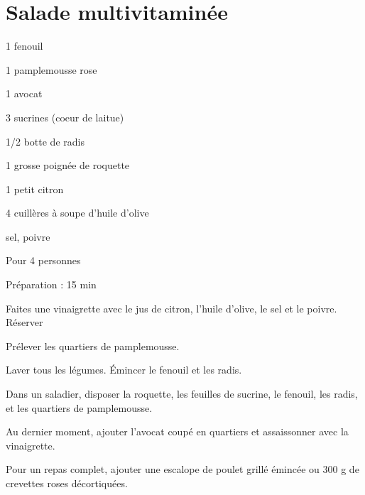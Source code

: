 \section{Salade multivitaminée}

\begin{ingredients}
\item 1 fenouil
\item 1 pamplemousse rose
\item 1 avocat
\item 3 sucrines (coeur de laitue)
\item 1/2 botte de radis
\item 1 grosse poignée de roquette
\item 1 petit citron
\item 4 cuillères à soupe d'huile d'olive
\item sel, poivre
\end{ingredients}
\begin{infos}
\item Pour 4 personnes		%
\item Préparation : 15 min		%
\end{infos}
\begin{etapes}
\item  Faites une vinaigrette avec le jus de citron, l'huile d'olive, le sel et le poivre. Réserver
\item Prélever les quartiers de pamplemousse.
\item Laver tous les légumes. Émincer le fenouil et les radis.
\item Dans un saladier, disposer la roquette, les feuilles de sucrine, le fenouil, les radis, et les quartiers de pamplemousse.
\item Au dernier moment, ajouter l'avocat coupé en quartiers et assaissonner avec la vinaigrette.
\item Pour un repas complet, ajouter une escalope de poulet grillé émincée ou 300 g de crevettes roses décortiquées.
\end{etapes}
\begin{conseils}
\end{conseils}
